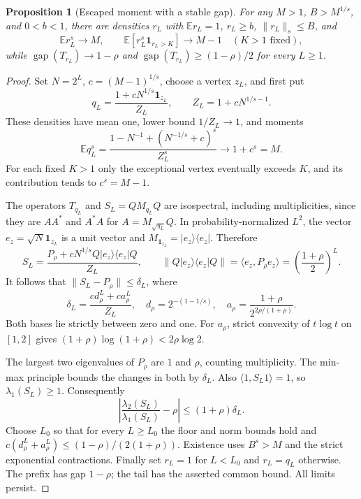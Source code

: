 \documentclass[11pt]{article}
\newtheorem{proposition}[theorem]{Proposition}
\newcommand{\gap}{\operatorname{gap}}
\begin{document}
\begin{proposition}[Escaped moment with a stable gap]\label{prop:stable-spike}
For any $M>1$, $B>M^{1/s}$, and $0<b<1$, there are densities $r_L$
with $\mathbb E r_L=1$, $r_L\ge b$, $\|r_L\|_s\le B$, and
\[
 \mathbb E r_L^s\to M,\qquad
 \mathbb E[r_L^s\mathbf1_{r_L>K}]\to M-1\quad(K>1\text{ fixed}),
\]
while $\gap(T_{r_L})\to1-\rho$ and
$\gap(T_{r_L})\ge(1-\rho)/2$ for every $L\ge1$.
\end{proposition}
\begin{proof}
Set $N=2^L$, $c=(M-1)^{1/s}$, choose a vertex $z_L$, and first put
\[
 q_L=\frac{1+cN^{1/s}\mathbf1_{z_L}}{Z_L},\qquad
 Z_L=1+cN^{1/s-1}.
\]
These densities have mean one, lower bound $1/Z_L\to1$, and moments
\[
 \mathbb E q_L^s=
 \frac{1-N^{-1}+(N^{-1/s}+c)^s}{Z_L^s}\longrightarrow1+c^s=M.
\]
For each fixed $K>1$ only the exceptional vertex eventually exceeds
$K$, and its contribution tends to $c^s=M-1$.

The operators $T_{q_L}$ and $S_L=QM_{q_L}Q$ are isospectral, including
multiplicities, since they are $AA^*$ and $A^*A$ for
$A=M_{\sqrt{q_L}}Q$. In probability-normalized $L^2$, the vector
$e_z=\sqrt N\mathbf1_{z_L}$ is a unit vector and
$M_{\mathbf1_{z_L}}=|e_z\rangle\langle e_z|$. Therefore
\[
 S_L=\frac{P_\rho+cN^{1/s}Q|e_z\rangle\langle e_z|Q}{Z_L},
 \qquad
 \|Q|e_z\rangle\langle e_z|Q\|
 =\langle e_z,P_\rho e_z\rangle
 =\left(\frac{1+\rho}{2}\right)^L.
\]
It follows that $\|S_L-P_\rho\|\le\delta_L$, where
\[
 \delta_L=\frac{c d_\rho^L+c a_\rho^L}{Z_L},\quad
 d_\rho=2^{-(1-1/s)},\quad
 a_\rho=\frac{1+\rho}{2^{2\rho/(1+\rho)}}.
\]
Both bases lie strictly between zero and one. For $a_\rho$, strict
convexity of $t\log t$ on $[1,2]$ gives
$(1+\rho)\log(1+\rho)<2\rho\log2$.

The largest two eigenvalues of $P_\rho$ are $1$ and $\rho$, counting
multiplicity. The min-max principle bounds the changes in both by
$\delta_L$. Also $\langle1,S_L1\rangle=1$, so $\lambda_1(S_L)\ge1$.
Consequently
\[
 \left|\frac{\lambda_2(S_L)}{\lambda_1(S_L)}-\rho\right|
 \le(1+\rho)\delta_L.
\]
Choose $L_0$ so that for every $L\ge L_0$ the floor and norm bounds
hold and $c(d_\rho^L+a_\rho^L)\le(1-\rho)/(2(1+\rho))$. Existence
uses $B^s>M$ and the strict exponential contractions. Finally set
$r_L=1$ for $L<L_0$ and $r_L=q_L$ otherwise. The prefix has gap
$1-\rho$; the tail has the asserted common bound. All limits persist.
\end{proof}
\end{document}
